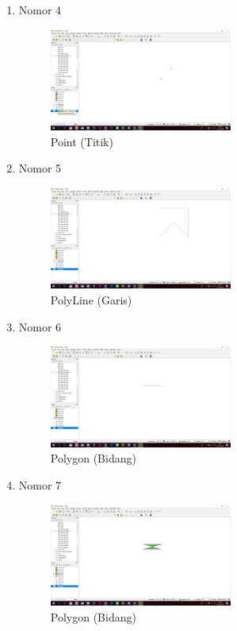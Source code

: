 \begin{enumerate}
	\item Nomor 4
	
	\begin{figure}[H]
		\includegraphics[width=6cm]{figures/Tugas2/1174053/no4.png}
		\centering
		\caption{Point (Titik)}
	\end{figure}
	
	\item Nomor 5
	
	\begin{figure}[H]
		\includegraphics[width=6cm]{figures/Tugas2/1174053/no5.png}
		\centering
		\caption{PolyLine (Garis)}
	\end{figure}
	
	\item Nomor 6
	
	\begin{figure}[H]
		\includegraphics[width=6cm]{figures/Tugas2/1174053/no6.png}
		\centering
		\caption{Polygon (Bidang)}
	\end{figure}
	
	\item Nomor 7
	
	\begin{figure}[H]
		\includegraphics[width=6cm]{figures/Tugas2/1174053/no7.png}
		\centering
		\caption{Polygon (Bidang)}
	\end{figure}
	

\end{enumerate}

